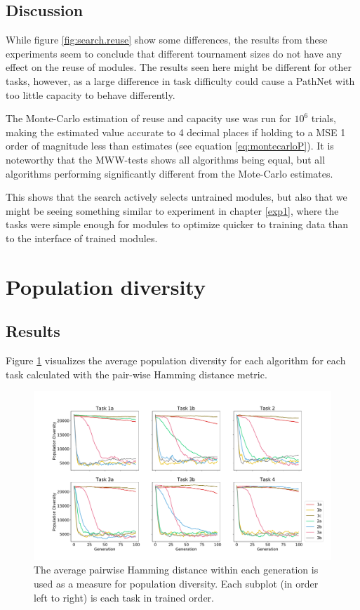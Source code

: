 \subsection{Discussion}
While figure \ref{fig:search.reuse} show some differences, the results from these experiments seem to conclude that different tournament sizes do not have any effect on the reuse of modules. The results seen here might be different for other tasks, however, as a large difference in task difficulty could cause a PathNet with too little capacity to behave differently.

The Monte-Carlo estimation of reuse and capacity use was run for \(10^{6}\) trials, making the estimated value accurate to 4 decimal places if holding to a MSE 1 order of magnitude less than estimates (see equation \ref{eq:montecarloP}). It is noteworthy that the MWW-tests shows all algorithms being equal, but all algorithms performing significantly different from the Mote-Carlo estimates. 

This shows that the search actively selects untrained modules, but also that we might be seeing something similar to experiment in chapter \ref{exp1}, where the tasks were simple enough for modules to optimize quicker to training data than to the interface of trained modules.

\section{Population diversity}
\label{exp2:diversity}
\subsection{Results}
Figure \ref{fig:search.hamming_diversity} visualizes the average population diversity for each algorithm for each task calculated with the pair-wise Hamming distance metric. 

\begin{figure}
    \includegraphics[width=1.2\textwidth,center]{Chapters/4.Experiments/exp2/figures/inuse/Average_population_diversity_reduced_hamming.pdf}
    \caption[Pair-wise Hamming distance diversity]{The average pairwise Hamming distance within each generation is used as a measure for population diversity. Each subplot (in order left to right) is each task in trained order.}
    \label{fig:search.hamming_diversity}
\end{figure}

